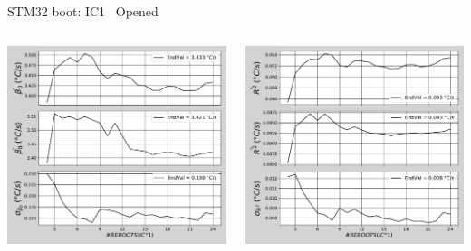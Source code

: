
\begin{frame}{STM32 boot: IC1 \textrightarrow\ Opened}
	\vspace{5mm}
	\begin{columns}
		\begin{column}{0.5\textwidth}
			\includegraphics[width=1.0\textwidth]{./figures/flistCircuit1_25_sl30beta0.pdf}
		\end{column}
		\begin{column}{0.5\textwidth}
			\includegraphics[width=1.0\textwidth]{./figures/flistCircuit1_25_sl30r2.pdf}
		\end{column}
	\end{columns}
\end{frame}

